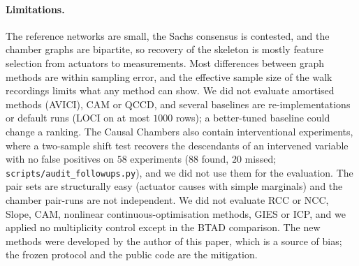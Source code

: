 \paragraph{Limitations.} The reference networks are small, the Sachs consensus is contested,
and the chamber graphs are bipartite, so recovery of the skeleton is mostly feature selection
from actuators to measurements. Most differences between graph methods are within sampling
error, and the effective sample size of the walk recordings limits what any method can show.
We did not evaluate amortised methods (AVICI), CAM or QCCD, and several baselines
are re-implementations or default runs (LOCI on at most $1000$ rows); a better-tuned baseline could change a ranking.
The Causal Chambers also contain interventional experiments, where a two-sample shift test recovers the
descendants of an intervened variable with no false positives on $58$ experiments ($88$ found, $20$
missed; \texttt{scripts/audit\_followups.py}), and we did not use them for the evaluation. The pair
sets are structurally easy (actuator causes with simple marginals) and the chamber pair-runs are not independent.
We did not evaluate RCC or NCC, Slope, CAM, nonlinear continuous-optimisation methods, GIES or ICP,
and we applied no multiplicity control except in the BTAD comparison. The new methods were
developed by the author of this paper, which is a source of bias; the frozen protocol and the
public code are the mitigation.
